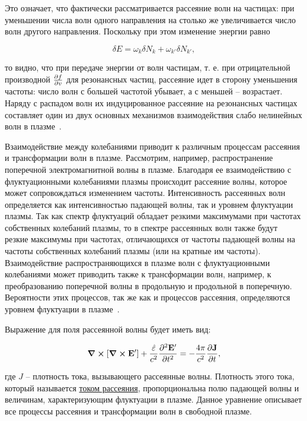 \documentclass[10pt, a4paper]{article}
\begin{document}
Это означает, что фактически рассматривается рассеяние волн на частицах: при уменьшении числа волн одного направления на столько же увеличивается число волн другого направления. Поскольку при этом изменение энергии равно

\begin{equation*}
	\delta E = \omega_k\delta N_k + \omega_{k'}\delta N_{k'},
\end{equation*} 

то видно, что при передаче энергии от волн частицам, т. е. при отрицательной производной $\pdv{f}{v}$ для резонансных частиц, рассеяние идет в сторону уменьшения частоты: число волн с большей частотой убывает, а с меньшей -- возрастает. Наряду с распадом волн их индуцированное рассеяние на резонансных частицах составляет один из двух основных механизмов взаимодействия слабо нелинейных волн в плазме~\cite{kadomtsev}.

Взаимодействие между колебаниями приводит к различным процессам рассеяния и трансформации волн в плазме. Рассмотрим, например, распространение поперечной электромагнитной волны в плазме. Благодаря ее взаимодействию с флуктуационными колебаниями плазмы происходит рассеяние волны, которое может сопровождаться изменением частоты. Интенсивность рассеянных волн определяется как интенсивностью падающей волны, так и уровнем флуктуации плазмы. Так как спектр флуктуаций обладает резкими максимумами при частотах собственных колебаний плазмы, то в спектре рассеянных волн также будут резкие максимумы при частотах, отличающихся от частоты падающей волны на частоты собственных колебаний плазмы (или на кратные им частоты). Взаимодействие распространяющихся в плазме волн с флуктуационными колебаниями может приводить также к трансформации волн, например, к преобразованию поперечной волны в продольную и продольной в поперечную. Вероятности этих процессов, так же как и процессов рассеяния, определяются уровнем флуктуации в плазме~\cite{akhiezer}.

Выражение для поля рассеянной волны будет иметь вид:

\begin{equation*}
	\curl{[\curl{\vb{E}'}]}+\frac{\hat{\varepsilon}}{c^2}\pdv[2]{\vb{E}'}{t} = -\frac{4\pi}{c^2}\pdv{\vb{J}}{t},
\end{equation*}

где $J$ -- плотность тока, вызывающего рассеянные волны. Плотность этого тока, который называется \uline{током рассеяния}, пропорциональна полю падающей волны и величинам, характеризующим флуктуации в плазме. Данное уравнение описывает все процессы рассеяния и трансформации волн в свободной плазме.
\end{document}
